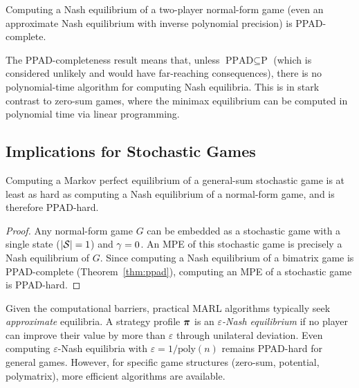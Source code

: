 \documentclass[11pt,a4paper]{article}
\begin{document}
\begin{theorem}
\label{thm:ppad}
Computing a Nash equilibrium of a two-player normal-form game (even
an approximate Nash equilibrium with inverse polynomial precision)
is PPAD-complete.
\end{theorem}

\begin{remark}
The PPAD-completeness result means that, unless $\text{PPAD}
\subseteq \text{P}$ (which is considered unlikely and would have
far-reaching consequences), there is no polynomial-time algorithm
for computing Nash equilibria.  This is in stark contrast to
zero-sum games, where the minimax equilibrium can be computed in
polynomial time via linear programming.
\end{remark}

\subsection{Implications for Stochastic Games}

\begin{proposition}
\label{prop:sg-hard}
Computing a Markov perfect equilibrium of a general-sum stochastic
game is at least as hard as computing a Nash equilibrium of a
normal-form game, and is therefore PPAD-hard.
\end{proposition}

\begin{proof}
Any normal-form game $G$ can be embedded as a stochastic game with a
single state ($|\mathcal{S}| = 1$) and $\gamma = 0$.  An MPE of this
stochastic game is precisely a Nash equilibrium of $G$.  Since
computing a Nash equilibrium of a bimatrix game is PPAD-complete
(Theorem~\ref{thm:ppad}), computing an MPE of a stochastic game
is PPAD-hard.
\end{proof}

\begin{remark}
Given the computational barriers, practical MARL algorithms typically
seek \emph{approximate} equilibria.  A strategy profile $\boldsymbol{\pi}$ is
an \emph{$\varepsilon$-Nash equilibrium} if no player can improve
their value by more than $\varepsilon$ through unilateral deviation.
Even computing $\varepsilon$-Nash equilibria with $\varepsilon =
1/\text{poly}(n)$ remains PPAD-hard for general games.  However,
for specific game structures (zero-sum, potential, polymatrix),
more efficient algorithms are available.
\end{remark}
\end{document}
